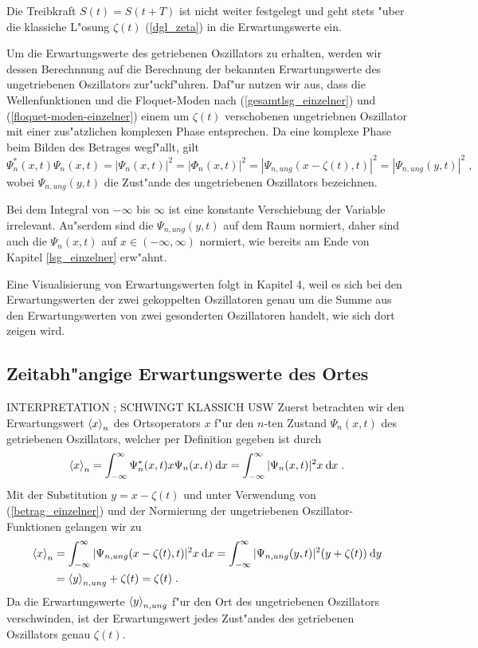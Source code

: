   Die Treibkraft $S(t)=S(t+T)$ ist nicht weiter festgelegt und geht stets "uber die klassiche L"osung $\zeta(t)$ (\ref{dgl_zeta}) in die Erwartungswerte ein.

  Um die Erwartungswerte des getriebenen Oszillators zu erhalten, werden wir dessen Berechnnung auf die Berechnung der bekannten Erwartungswerte des ungetriebenen Oszillators zur"uckf"uhren.
  Daf"ur nutzen wir aus, dass die Wellenfunktionen und die Floquet-Moden nach (\ref{gesamtlsg_einzelner}) und (\ref{floquet-moden-einzelner}) einem um $\zeta(t)$ verschobenen ungetriebnen Oszillator mit einer zus"atzlichen komplexen Phase entsprechen.
  Da eine komplexe Phase beim Bilden des Betrages wegf"allt, gilt
  \begin{equation}
    \Psi_n^*(x,t)\Psi_n(x,t) = |\Psi_n(x,t)|^2 = |\Phi_n(x,t)|^2 = |\Psi_{n,ung}(x-\zeta(t),t)|^2 = |\Psi_{n,ung}(y,t)|^2 \; ,
    \label{betrag_einzelner}
  \end{equation}
  wobei $\Psi_{n,ung}(y,t)$ die Zust"ande des ungetriebenen Oszillators bezeichnen.

  Bei dem Integral von $-\infty$ bis $\infty$ ist eine konstante Verschiebung der Variable irrelevant.
  Au"serdem sind die $\Psi_{n,ung}(y,t)$ auf dem Raum normiert, daher sind auch die $\Psi_n(x,t)$ auf $x \in (-\infty,\infty)$ normiert, wie bereits am Ende von Kapitel \ref{lsg_einzelner} erw"ahnt.

  Eine Visualisierung von Erwartungswerten folgt in Kapitel 4, weil es sich bei den Erwartungswerten der zwei gekoppelten Oszillatoren genau um die Summe aus den Erwartungswerten von zwei gesonderten Oszillatoren handelt, wie sich dort zeigen wird.

  \subsection{Zeitabh"angige Erwartungswerte des Ortes}
  INTERPRETATION ; SCHWINGT KLASSICH USW
    Zuerst betrachten wir den Erwartungswert $\braket{x}_n$ des Ortsoperators $x$ f"ur den $n$-ten Zustand $\Psi_n(x,t)$ des getriebenen Oszillators, welcher per Definition gegeben ist durch
    \begin{equation}
      \braket{x}_n = \int_{-\infty}^{\infty} \Psi_n^*(x,t)x\Psi_n(x,t) \: \text dx
      = \int_{-\infty}^{\infty} |\Psi_n(x,t)|^2 x \: \text dx \; .
    \end{equation}
    Mit der Substitution $y=x-\zeta(t)$ und unter Verwendung von (\ref{betrag_einzelner}) und der Normierung der ungetriebenen Oszillator-Funktionen gelangen wir zu
    \begin{align}
      \begin{split}
        \braket{x}_n &= \int_{-\infty}^{\infty} |\Psi_{n,ung}(x-\zeta(t),t)|^2 x \: \text dx
        = \int_{-\infty}^{\infty} |\Psi_{n,ung}(y,t)|^2 (y+\zeta(t)) \: \text dy \\
        &= \braket{y}_{n,ung} + \zeta(t) = \zeta(t) \; .
      \end{split}
    \end{align}
    Da die Erwartungswerte $\braket{y}_{n,ung}$ f"ur den Ort des ungetriebenen Oszillators verschwinden, ist der Erwartungswert jedes Zust"andes des getriebenen Oszillators genau $\zeta(t)$.

